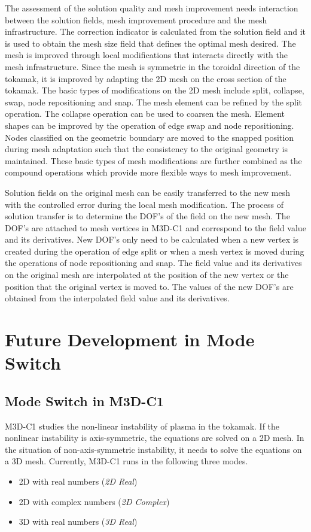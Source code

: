 \documentclass[11pt]{article}  %
\begin{document}
The assessment of the solution quality and mesh improvement needs interaction between the solution fields, mesh improvement procedure and the mesh infrastructure.  The correction indicator is calculated from the solution field and it is used to obtain the mesh size field that defines the optimal mesh desired.  The mesh is improved through local modifications \cite{li20053d,sahni2007automated, lu2013parallel} that interacts directly with the mesh infrastructure. Since the mesh is symmetric in the toroidal direction of the tokamak,  it is improved by adapting the 2D mesh on the cross section of the tokamak. The basic types of modifications on the 2D mesh include split, collapse, swap, node repositioning and snap. The mesh element can be refined by the split operation. The collapse operation can be used to coarsen the mesh. Element shapes can be improved by the operation of edge swap and node repositioning. Nodes classified on the geometric boundary are moved to the snapped position during mesh adaptation such that the consistency to the original geometry is maintained. These basic types of mesh modifications are further combined as the compound operations which provide more flexible ways to mesh improvement.

Solution fields on the original mesh can be easily transferred to the new mesh with the controlled error during the local mesh modification.  The process of solution transfer is to determine the DOF's of the field on the new mesh. The DOF's are attached to mesh vertices in M3D-C1 \cite{jardin2004triangular,jardin2012multiple} and correspond to the field value and its derivatives. New DOF's only need to be calculated when a new vertex is created during the operation of edge split or when a mesh vertex is moved during the operations of node repositioning and snap.  The field value and its derivatives on the original mesh are interpolated at the position of the new vertex or the position that the original vertex is moved to. The values of the new DOF's are obtained from the interpolated field value and its derivatives.

\section{Future Development in Mode Switch} \label{sec:futuredevelop}
\subsection{Mode Switch in M3D-C1} \label{sec:modeswitch}
 M3D-C1 studies the non-linear instability of plasma in the tokamak.  If the nonlinear instability is axis-symmetric, the equations are solved on a 2D mesh. In the situation of non-axis-symmetric instability, it needs to solve the equations on a 3D mesh. Currently, M3D-C1 runs in the following three modes.
\begin{itemize}
\item 2D with real numbers (\textit{2D Real})
\item 2D with complex numbers (\textit{2D Complex})
\item 3D with real numbers (\textit{3D Real})
\end{itemize}
\end{document}
